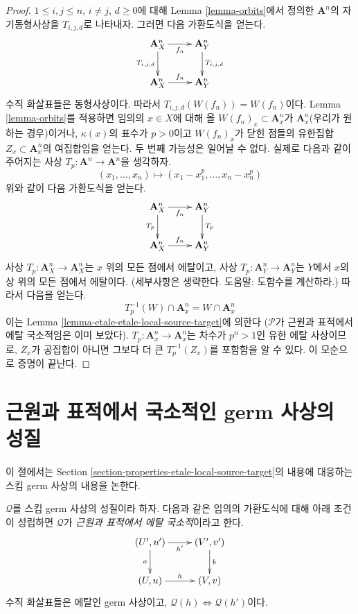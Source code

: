 \begin{proof}
\medskip\noindent
$1 \leq i, j \leq n$, $i \not = j$, $d \geq 0$에 대해 Lemma
\ref{lemma-orbits}에서 정의한 $\mathbf{A}^n$의 자기동형사상을
$T_{i, j, d}$로 나타내자. 그러면 다음 가환도식을 얻는다.
$$
\xymatrix{
\mathbf{A}^n_X \ar[r]_{f_n} \ar[d]_{T_{i, j, d}} &
\mathbf{A}^n_Y \ar[d]^{T_{i, j, d}} \\
\mathbf{A}^n_X \ar[r]^{f_n} & \mathbf{A}^n_Y
}
$$
수직 화살표들은 동형사상이다. 따라서
$T_{i, j, d}(W(f_n)) = W(f_n)$이다. Lemma \ref{lemma-orbits}를
적용하면 임의의 $x \in X$에 대해 올
$W(f_n)_x \subset \mathbf{A}^n_x$가 $\mathbf{A}^n_x$(우리가 원하는
경우)이거나, $\kappa(x)$의 표수가 $p > 0$이고 $W(f_n)_x$가 닫힌
점들의 유한집합 $Z_x \subset \mathbf{A}^n_x$의 여집합임을 얻는다.
두 번째 가능성은 일어날 수 없다. 실제로 다음과 같이 주어지는 사상
$T_p : \mathbf{A}^n \to \mathbf{A}^n$을 생각하자.
$$
(x_1, \ldots, x_n) \mapsto (x_1 - x_1^p, \ldots, x_n - x_n^p)
$$
위와 같이 다음 가환도식을 얻는다.
$$
\xymatrix{
\mathbf{A}^n_X \ar[r]_{f_n} \ar[d]_{T_p} &
\mathbf{A}^n_Y \ar[d]^{T_p} \\
\mathbf{A}^n_X \ar[r]^{f_n} & \mathbf{A}^n_Y
}
$$
사상 $T_p : \mathbf{A}^n_X \to \mathbf{A}^n_X$는 $x$ 위의 모든
점에서 에탈이고, 사상 $T_p : \mathbf{A}^n_Y \to \mathbf{A}^n_Y$는
$Y$에서 $x$의 상 위의 모든 점에서 에탈이다. (세부사항은 생략한다.
도움말: 도함수를 계산하라.) 따라서 다음을 얻는다.
$$
T_p^{-1}(W) \cap \mathbf{A}^n_x = W \cap \mathbf{A}^n_x
$$
이는 Lemma \ref{lemma-etale-etale-local-source-target}에 의한다
($\mathcal{P}$가 근원과 표적에서 에탈 국소적임은 이미 보았다).
$T_p : \mathbf{A}^n_x \to \mathbf{A}^n_x$는 차수가 $p^n > 1$인
유한 에탈 사상이므로, $Z_x$가 공집합이 아니면 그보다 더 큰
$T_p^{-1}(Z_x)$를 포함함을 알 수 있다. 이 모순으로 증명이 끝난다.
\end{proof}





\section{근원과 표적에서 국소적인 germ 사상의 성질}
\label{section-local-source-target-at-point}

\noindent
이 절에서는 Section \ref{section-properties-etale-local-source-target}의
내용에 대응하는 스킴 germ 사상의 내용을 논한다.

\begin{definition}
\label{definition-local-source-target-at-point}
$\mathcal{Q}$를 스킴 germ 사상의 성질이라 하자. 다음과 같은 임의의
가환도식에 대해 아래 조건이 성립하면 $\mathcal{Q}$가
{\it 근원과 표적에서 에탈 국소적}이라고 한다.
$$
\xymatrix{
(U', u') \ar[d]_a \ar[r]_{h'} & (V', v') \ar[d]^b \\
(U, u) \ar[r]^h & (V, v)
}
$$
수직 화살표들은 에탈인 germ 사상이고,
$\mathcal{Q}(h) \Leftrightarrow \mathcal{Q}(h')$이다.
\end{definition}

